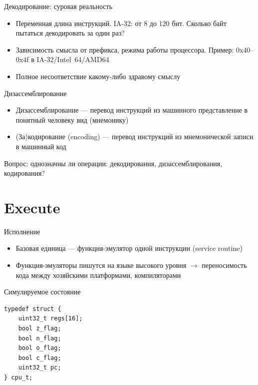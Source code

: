 \documentclass{beamer}
\begin{document}
\begin{frame}{Декодирование: суровая реальность}
\begin{itemize}
\item Переменная длина инструкций. IA-32: от 8 до 120 бит. Сколько байт пытаться декодировать за один раз?
\item Зависимость смысла от префикса, режима работы процессора. Пример: 0x40–0x4f в IA-32/Intel~64/AMD64
\item Полное несоответствие какому-либо здравому смыслу
\end{itemize}

\end{frame}

\begin{frame}{Дизассемблирование}
\begin{itemize}
\item Дизассемблирование — перевод инструкций из машинного представление в понятный
человеку вид (мнемонику)
\item (За)кодирование (encoding) — перевод инструкций из мнемонической записи в
машинный код
\end{itemize}
\pause
Вопрос: однозначны ли операции: декодирования, дизассемблирования, кодирования?
\end{frame}

\section{Execute}

\begin{frame}{Исполнение}

\begin{itemize}
\item Базовая единица — функция-эмулятор одной инструкции (service routine)
\item Функция-эмуляторы пишутся на языке высокого уровня $\rightarrow$ переносимость кода между хозяйскими
платформами, компиляторами



\end{itemize}
\end{frame}

\begin{frame}[fragile]{Симулируемое состояние}
\begin{verbatim}
typedef struct {
    uint32_t regs[16];
    bool z_flag;
    bool n_flag;
    bool o_flag;
    bool c_flag;
    uint32_t pc;
} cpu_t;
\end{verbatim}
\end{frame}
\end{document}
